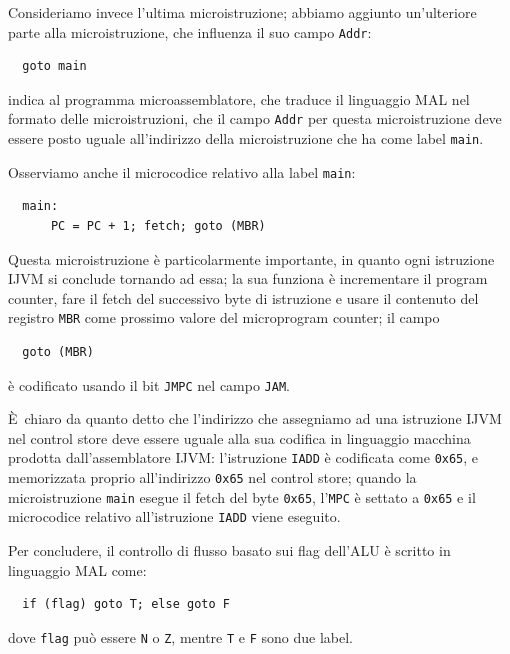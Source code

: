 \documentclass[a4paper,12pt]{scrreprt}
\begin{document}
Consideriamo invece l'ultima microistruzione; abbiamo aggiunto un'ulteriore
parte alla microistruzione, che influenza il suo campo \lstinline{Addr}:

\begin{lstlisting}
  goto main
\end{lstlisting}

indica al programma microassemblatore, che traduce il linguaggio MAL nel formato
delle microistruzioni, che il campo \lstinline{Addr} per questa microistruzione
deve essere posto uguale all'indirizzo della microistruzione che ha come label
\lstinline{main}.

Osserviamo anche il microcodice relativo alla label \lstinline{main}:

\begin{lstlisting}
  main:
      PC = PC + 1; fetch; goto (MBR)
\end{lstlisting}

Questa microistruzione è particolarmente importante, in quanto ogni istruzione
IJVM si conclude tornando ad essa; la sua funziona è incrementare il program
counter, fare il fetch del successivo byte di istruzione e usare il contenuto
del registro \lstinline{MBR} come prossimo valore del microprogram counter; il
campo

\begin{lstlisting}
  goto (MBR)
\end{lstlisting}

è codificato usando il bit \lstinline{JMPC} nel campo \lstinline{JAM}.

È chiaro da quanto detto che l'indirizzo che assegniamo ad una istruzione IJVM
nel control store deve essere uguale alla sua codifica in linguaggio macchina
prodotta dall'assemblatore IJVM: l'istruzione \lstinline{IADD} è codificata come
\lstinline{0x65}, e memorizzata proprio all'indirizzo \lstinline{0x65} nel
control store; quando la microistruzione \lstinline{main} esegue il fetch del
byte \lstinline{0x65}, l'\lstinline{MPC} è settato a \lstinline{0x65} e il
microcodice relativo all'istruzione \lstinline{IADD} viene eseguito.

Per concludere, il controllo di flusso basato sui flag dell'ALU è scritto in
linguaggio MAL come:

\begin{lstlisting}
  if (flag) goto T; else goto F
\end{lstlisting}

dove \lstinline{flag} può essere \lstinline{N} o \lstinline{Z}, mentre
\lstinline{T} e \lstinline{F} sono due label.
\end{document}
